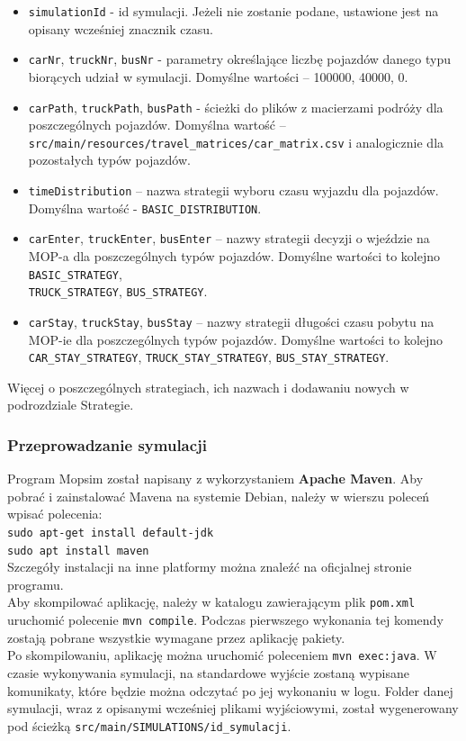 \begin{itemize}
\item \texttt{simulationId} - id symulacji. Jeżeli nie zostanie podane, ustawione jest na opisany wcześniej znacznik czasu.
\item \texttt{carNr}, \texttt{truckNr}, \texttt{busNr} - parametry określające liczbę pojazdów danego typu biorących udział w symulacji. Domyślne wartości -- 100000, 40000, 0.
\item \texttt{carPath}, \texttt{truckPath}, \texttt{busPath} - ścieżki do plików z macierzami podróży dla poszczególnych pojazdów. Domyślna wartość -- \\\texttt{src/main/resources/travel\_matrices/car\_matrix.csv} i analogicznie dla pozostałych typów pojazdów.
\item \texttt{timeDistribution} -- nazwa strategii wyboru czasu wyjazdu dla pojazdów. Domyślna wartość - \texttt{BASIC\_DISTRIBUTION}.
\item \texttt{carEnter}, \texttt{truckEnter}, \texttt{busEnter} -- nazwy strategii decyzji o wjeździe na MOP-a dla poszczególnych typów pojazdów. Domyślne wartości to kolejno \texttt{BASIC\_STRATEGY}, \\\texttt{TRUCK\_STRATEGY}, \texttt{BUS\_STRATEGY}.
\item \texttt{carStay}, \texttt{truckStay}, \texttt{busStay} -- nazwy strategii długości czasu pobytu na MOP-ie dla poszczególnych typów pojazdów. Domyślne wartości to kolejno \texttt{CAR\_STAY\_STRATEGY}, \texttt{TRUCK\_STAY\_STRATEGY}, \texttt{BUS\_STAY\_STRATEGY}.
\end{itemize}
Więcej o poszczególnych strategiach, ich nazwach i dodawaniu nowych w podrozdziale Strategie.
\subsubsection{Przeprowadzanie symulacji}
Program Mopsim został napisany z wykorzystaniem \textbf{Apache Maven}. Aby pobrać i zainstalować Mavena na systemie Debian, należy w wierszu poleceń wpisać polecenia:\\
\texttt{sudo apt-get install default-jdk}\\
\texttt{sudo apt install maven}\\
Szczegóły instalacji na inne platformy można znaleźć na oficjalnej stronie programu.\\
Aby skompilować aplikację, należy w katalogu zawierającym plik \texttt{pom.xml} uruchomić polecenie \texttt{mvn compile}. Podczas pierwszego wykonania tej komendy zostają pobrane wszystkie wymagane przez aplikację pakiety.\\
Po skompilowaniu, aplikację można uruchomić poleceniem \texttt{mvn exec:java}. W czasie wykonywania symulacji, na standardowe wyjście zostaną wypisane komunikaty, które będzie można odczytać po jej wykonaniu w logu. Folder danej symulacji, wraz z opisanymi wcześniej plikami wyjściowymi, został wygenerowany pod ścieżką \texttt{src/main/SIMULATIONS/id\_symulacji}.
